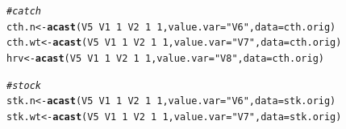 \documentclass[a4paper,english,10pt]{article}\usepackage[]{graphicx}\usepackage[]{color}
\makeatletter
\newcommand{\hlnum}[1]{\textcolor[rgb]{0.686,0.059,0.569}{#1}}%
\newcommand{\hlstr}[1]{\textcolor[rgb]{0.192,0.494,0.8}{#1}}%
\newcommand{\hlcom}[1]{\textcolor[rgb]{0.678,0.584,0.686}{\textit{#1}}}%
\newcommand{\hlopt}[1]{\textcolor[rgb]{0,0,0}{#1}}%
\newcommand{\hlstd}[1]{\textcolor[rgb]{0.345,0.345,0.345}{#1}}%
\newcommand{\hlkwb}[1]{\textcolor[rgb]{0.69,0.353,0.396}{#1}}%
\newcommand{\hlkwc}[1]{\textcolor[rgb]{0.333,0.667,0.333}{#1}}%
\newcommand{\hlkwd}[1]{\textcolor[rgb]{0.737,0.353,0.396}{\textbf{#1}}}%
\newenvironment{kframe}{%
 \def\at@end@of@kframe{}%
 \ifinner\ifhmode%
  \def\at@end@of@kframe{\end{minipage}}%
  \begin{minipage}{\columnwidth}%
 \fi\fi%
 \def\FrameCommand##1{\hskip\@totalleftmargin \hskip-\fboxsep
 \colorbox{shadecolor}{##1}\hskip-\fboxsep
     \hskip-\linewidth \hskip-\@totalleftmargin \hskip\columnwidth}%
 \MakeFramed {\advance\hsize-\width
   \@totalleftmargin\z@ \linewidth\hsize
   \@setminipage}}%
 {\par\unskip\endMakeFramed%
 \at@end@of@kframe}
\newenvironment{knitrout}{}{} %
\makeatother
\begin{document}
\begin{knitrout}
\color{fgcolor}\begin{kframe}
\begin{alltt}
\hlcom{# catch}
\hlstd{cth.n} \hlkwb{<-} \hlkwd{acast}\hlstd{(V5} \hlopt{~} \hlstd{V1} \hlopt{~} \hlnum{1} \hlopt{~} \hlstd{V2} \hlopt{~} \hlnum{1} \hlopt{~} \hlnum{1}\hlstd{,} \hlkwc{value.var} \hlstd{=} \hlstr{"V6"}\hlstd{,} \hlkwc{data} \hlstd{= cth.orig)}
\hlstd{cth.wt} \hlkwb{<-} \hlkwd{acast}\hlstd{(V5} \hlopt{~} \hlstd{V1} \hlopt{~} \hlnum{1} \hlopt{~} \hlstd{V2} \hlopt{~} \hlnum{1} \hlopt{~} \hlnum{1}\hlstd{,} \hlkwc{value.var} \hlstd{=} \hlstr{"V7"}\hlstd{,} \hlkwc{data} \hlstd{= cth.orig)}
\hlstd{hrv} \hlkwb{<-} \hlkwd{acast}\hlstd{(V5} \hlopt{~} \hlstd{V1} \hlopt{~} \hlnum{1} \hlopt{~} \hlstd{V2} \hlopt{~} \hlnum{1} \hlopt{~} \hlnum{1}\hlstd{,} \hlkwc{value.var} \hlstd{=} \hlstr{"V8"}\hlstd{,} \hlkwc{data} \hlstd{= cth.orig)}

\hlcom{# stock}
\hlstd{stk.n} \hlkwb{<-} \hlkwd{acast}\hlstd{(V5} \hlopt{~} \hlstd{V1} \hlopt{~} \hlnum{1} \hlopt{~} \hlstd{V2} \hlopt{~} \hlnum{1} \hlopt{~} \hlnum{1}\hlstd{,} \hlkwc{value.var} \hlstd{=} \hlstr{"V6"}\hlstd{,} \hlkwc{data} \hlstd{= stk.orig)}
\hlstd{stk.wt} \hlkwb{<-} \hlkwd{acast}\hlstd{(V5} \hlopt{~} \hlstd{V1} \hlopt{~} \hlnum{1} \hlopt{~} \hlstd{V2} \hlopt{~} \hlnum{1} \hlopt{~} \hlnum{1}\hlstd{,} \hlkwc{value.var} \hlstd{=} \hlstr{"V7"}\hlstd{,} \hlkwc{data} \hlstd{= stk.orig)}


\end{alltt}
\end{kframe}
\end{knitrout}
\end{document}
